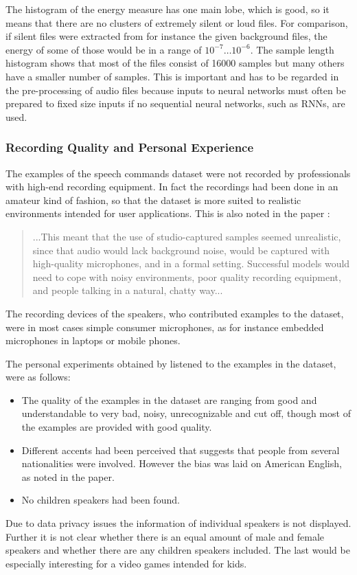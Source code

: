 \FloatBarrier
\noindent
The histogram of the energy measure has one main lobe, which is good, so it means that there are no clusters of extremely silent or loud files.
For comparison, if silent files were extracted from for instance the given background files, the energy of some of those would be in a range of $10^{-7} \dots 10^{-6}$.
The sample length histogram shows that most of the files consist of 16000 samples but many others have a smaller number of samples. 
This is important and has to be regarded in the pre-processing of audio files because inputs to neural networks must often be prepared to fixed size inputs if no sequential neural networks, such as RNNs, are used.



\subsubsection{Recording Quality and Personal Experience}
The examples of the speech commands dataset \cite{Warden2018} were not recorded by professionals with high-end recording equipment.
In fact the recordings had been done in an amateur kind of fashion, so that the dataset is more suited to realistic environments intended for user applications.
This is also noted in the paper \cite{Warden2018}:
\begin{quote}
...This meant that the use of studio-captured samples seemed unrealistic, since that audio would lack background noise, would be captured with high-quality microphones, and in a formal setting. 
Successful models would need to cope with noisy environments, poor quality recording equipment, and people talking in a natural, chatty way...
\end{quote}
The recording devices of the speakers, who contributed examples to the dataset, were in most cases simple consumer microphones, as for instance embedded microphones in laptops or mobile phones.

The personal experiments obtained by listened to the examples in the dataset, were as follows:
\begin{itemize}
  \item The quality of the examples in the dataset are ranging from good and understandable to very bad, noisy, unrecognizable and cut off, though most of the examples are provided with good quality.
  \item Different accents had been perceived that suggests that people from several nationalities were involved.
  However the bias was laid on American English, as noted in the paper.
  \item No children speakers had been found.
\end{itemize}
Due to data privacy issues the information of individual speakers is not displayed.
Further it is not clear whether there is an equal amount of male and female speakers and whether there are any children speakers included.
The last would be especially interesting for a video games intended for kids.

